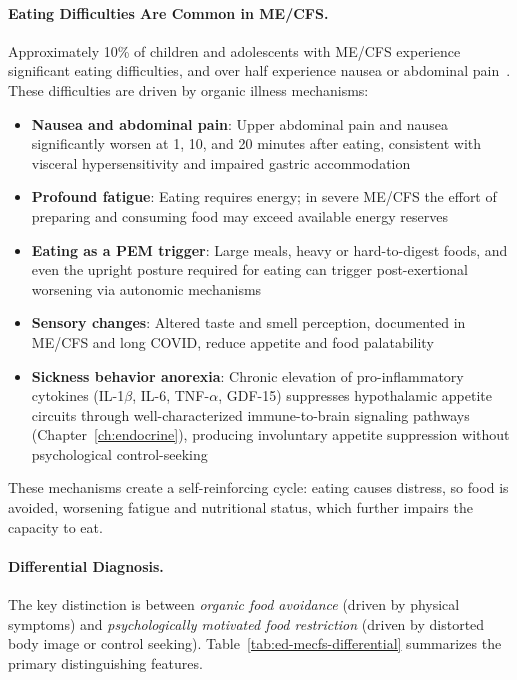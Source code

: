 \paragraph{Eating Difficulties Are Common in ME/CFS.}
Approximately 10\% of children and adolescents with ME/CFS experience significant eating difficulties, and over half experience nausea or abdominal pain~\cite{Harris2017eating}. These difficulties are driven by organic illness mechanisms:

\begin{itemize}
    \item \textbf{Nausea and abdominal pain}: Upper abdominal pain and nausea significantly worsen at 1, 10, and 20 minutes after eating, consistent with visceral hypersensitivity and impaired gastric accommodation~\cite{Gijsbers2023gastric}
    \item \textbf{Profound fatigue}: Eating requires energy; in severe ME/CFS the effort of preparing and consuming food may exceed available energy reserves
    \item \textbf{Eating as a PEM trigger}: Large meals, heavy or hard-to-digest foods, and even the upright posture required for eating can trigger post-exertional worsening via autonomic mechanisms
    \item \textbf{Sensory changes}: Altered taste and smell perception, documented in ME/CFS and long COVID, reduce appetite and food palatability
    \item \textbf{Sickness behavior anorexia}: Chronic elevation of pro-inflammatory cytokines (IL-1$\beta$, IL-6, TNF-$\alpha$, GDF-15) suppresses hypothalamic appetite circuits through well-characterized immune-to-brain signaling pathways (Chapter~\ref{ch:endocrine}), producing involuntary appetite suppression without psychological control-seeking
\end{itemize}

These mechanisms create a self-reinforcing cycle: eating causes distress, so food is avoided, worsening fatigue and nutritional status, which further impairs the capacity to eat.

\paragraph{Differential Diagnosis.}
The key distinction is between \emph{organic food avoidance} (driven by physical symptoms) and \emph{psychologically motivated food restriction} (driven by distorted body image or control seeking). Table~\ref{tab:ed-mecfs-differential} summarizes the primary distinguishing features.

